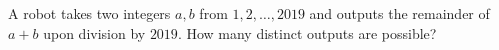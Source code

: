 A robot takes two integers $a,b$ from $1,2,\ldots,2019$ and outputs the remainder of $a+b$ upon division by $2019$. How many distinct outputs are possible?
